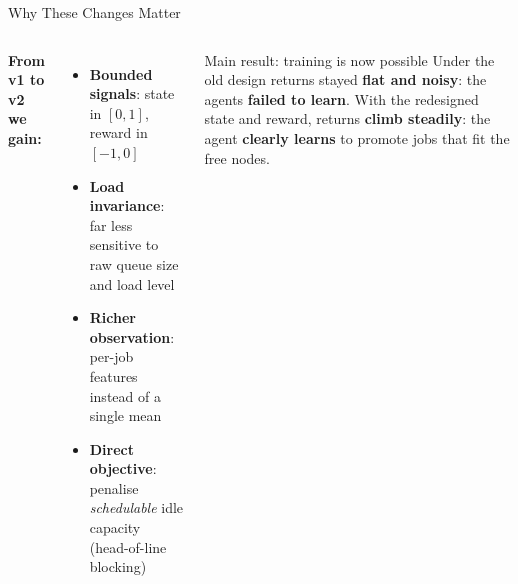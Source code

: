 \begin{frame}{Why These Changes Matter}
  \begin{columns}[T]
      \textbf{From v1 to v2 we gain:}
      \begin{itemize}
        \item \textbf{Bounded signals}: state in $[0,1]$, reward in $[-1,0]$
        \item \textbf{Load invariance}: far less sensitive to raw queue size and load level
        \item \textbf{Richer observation}: per-job features instead of a single mean
        \item \textbf{Direct objective}: penalise \emph{schedulable} idle capacity (head-of-line blocking)
      \end{itemize}

      \begin{alertblock}{Main result: training is now possible}
        Under the old design returns stayed \textbf{flat and noisy}: the agents
        \textbf{failed to learn}. With the redesigned state and reward, returns
        \textbf{climb steadily}: the agent \textbf{clearly learns} to promote
        jobs that fit the free nodes.
      \end{alertblock}
  \end{columns}
\end{frame}